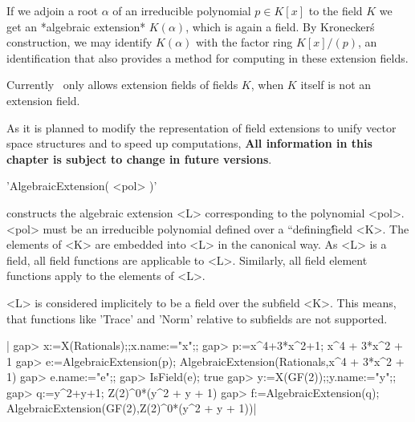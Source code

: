 
If we adjoin a root $\alpha$ of an irreducible polynomial $p \in K[x]$ to
the field $K$ we get an *algebraic extension* $K(\alpha)$, which is again
a field.  By Kronecker\'s construction, we may identify $K(\alpha)$ with
the factor ring $K[x]/(p)$, an identification that also provides a method
for computing in these extension fields.

Currently \GAP\ only allows extension fields of fields $K$, when $K$
itself is not an extension field.

As it is planned to modify the representation of field extensions to
unify vector space structures and to speed up computations, {\bf All
information in this chapter is subject to change in future versions}.


'AlgebraicExtension( <pol> )'

constructs the algebraic extension <L> corresponding to the polynomial
<pol>.  <pol> must be an irreducible polynomial defined over a
``defining\'\' field <K>.  The elements of <K> are embedded into <L> in
the canonical way.  As <L> is a field, all field functions are applicable
to <L>.  Similarly, all field element functions apply to the elements of
<L>.

<L> is considered implicitely to be a field over the subfield <K>.  This
means, that functions like 'Trace' and 'Norm' relative to subfields are
not supported.

|    gap> x:=X(Rationals);;x.name:="x";;
    gap> p:=x^4+3*x^2+1;
    x^4 + 3*x^2 + 1
    gap> e:=AlgebraicExtension(p);
    AlgebraicExtension(Rationals,x^4 + 3*x^2 + 1)
    gap> e.name:="e";;
    gap> IsField(e);
    true
    gap> y:=X(GF(2));;y.name:="y";;
    gap> q:=y^2+y+1;
    Z(2)^0*(y^2 + y + 1)
    gap> f:=AlgebraicExtension(q);
    AlgebraicExtension(GF(2),Z(2)^0*(y^2 + y + 1))|

